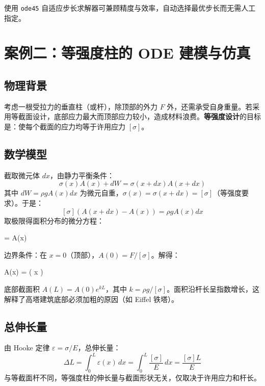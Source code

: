 使用 \texttt{ode45} 自适应步长求解器可兼顾精度与效率，自动选择最优步长而无需人工指定。

\section{案例二：等强度柱的 ODE 建模与仿真}

\subsection{物理背景}

考虑一根受拉力的垂直柱（或杆），除顶部的外力 $F$ 外，还需承受自身重量。若采用等截面设计，底部应力最大而顶部应力较小，造成材料浪费。\textbf{等强度设计}的目标是：使每个截面的应力均等于许用应力 $[\sigma]$。

\subsection{数学模型}

截取微元体 $dx$，由静力平衡条件：
\[
\sigma(x) A(x) + dW = \sigma(x+dx) A(x+dx)
\]
其中 $dW = \rho g A(x) dx$ 为微元自重，$\sigma(x) = \sigma(x+dx) = [\sigma]$（等强度要求）。于是：
\[
[\sigma] (A(x+dx) - A(x)) = \rho g A(x) dx
\]
取极限得面积分布的微分方程：
\begin{myformula}
	 =  A(x)
\end{myformula}

边界条件：在 $x = 0$（顶部），$A(0) = F / [\sigma]$。解得：
\begin{myformula}
	A(x) =  \exp\left(  x \right)
\end{myformula}

\begin{remark}
	底部截面积 $A(L) = A(0) e^{kL}$，其中 $k = \rho g / [\sigma]$。面积沿杆长呈指数增长，这解释了高塔建筑底部必须加粗的原因（如 Eiffel 铁塔）。
\end{remark}

\subsection{总伸长量}

由 Hooke 定律 $\varepsilon = \sigma / E$，总伸长量：
\[
\Delta L = \int_{0}^{L} \varepsilon(x) \, dx = \int_{0}^{L} \frac{[\sigma]}{E} \, dx = \frac{[\sigma] L}{E}
\]
与等截面杆不同，等强度柱的伸长量与截面形状无关，仅取决于许用应力和杆长。


